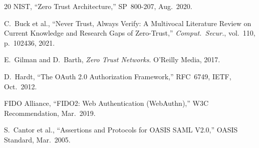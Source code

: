 \documentclass[journal]{IEEEtran}
\begin{document}
\begin{thebibliography}{20}
NIST, ``Zero Trust Architecture,'' SP~800-207, Aug.~2020.

C.~Buck et al., ``Never Trust, Always Verify: A Multivocal Literature Review on Current
Knowledge and Research Gaps of Zero-Trust,'' \textit{Comput.\ Secur.}, vol.~110,
p.~102436, 2021.

E.~Gilman and D.~Barth, \textit{Zero Trust Networks}. O'Reilly Media, 2017.

D.~Hardt, ``The OAuth 2.0 Authorization Framework,'' RFC~6749, IETF, Oct.~2012.

FIDO Alliance, ``FIDO2: Web Authentication (WebAuthn),'' W3C Recommendation, Mar.~2019.

S.~Cantor et al., ``Assertions and Protocols for OASIS SAML V2.0,'' OASIS Standard,
Mar.~2005.

\end{thebibliography}

\vspace{12pt}
\end{document}
